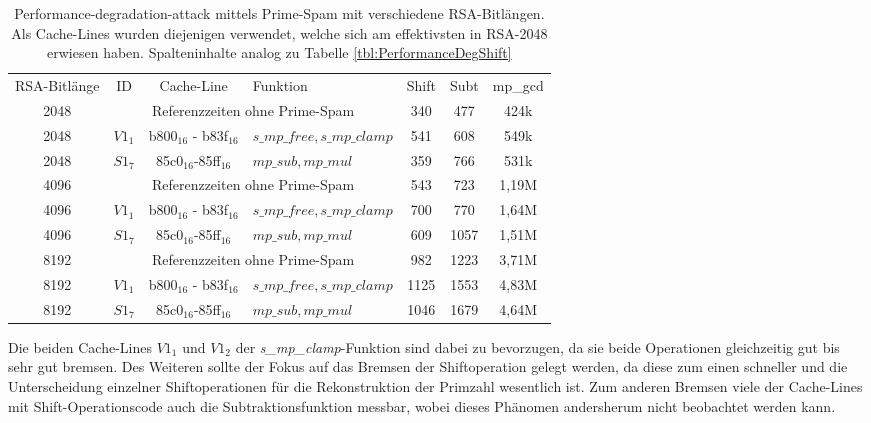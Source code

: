 \begin{table}[h]
\caption{Performance-degradation-attack mittels Prime-Spam mit verschiedene RSA-Bitlängen.
Als Cache-Lines wurden diejenigen verwendet, welche sich am effektivsten in RSA-2048 erwiesen haben.
Spalteninhalte analog zu Tabelle \ref{tbl:PerformanceDegShift}}
\label{tbl:PerformanceDegR$S2_6$ifferentBitlength}
\begin{tabular}{ccclccc}
RSA-Bitlänge & ID & Cache-Line & Funktion & Shift & Subt & mp\_gcd \\[10pt]
2048         &\multicolumn{3}{c}{Referenzzeiten ohne Prime-Spam}                                         & 340   & 477         & 424k    \\
2048         & $V1_1$& b800$_{16}$ - b83f$_{16}$ & $s\_mp\_free, s\_mp\_clamp$                 & 541   & 608         & 549k    \\
2048         & $S1_7$& 85c0$_{16}$-85ff$_{16}$  & $mp\_sub, mp\_mul$            & 359   & 766         & 531k    \\
4096         & \multicolumn{3}{c}{Referenzzeiten ohne Prime-Spam}                                         & 543   & 723         & 1,19M    \\
4096         & $V1_1$& b800$_{16}$ - b83f$_{16}$ & $s\_mp\_free, s\_mp\_clamp$                 & 700   & 770         & 1,64M    \\
4096         & $S1_7$& 85c0$_{16}$-85ff$_{16}$  & $mp\_sub, mp\_mul$            & 609   & 1057         & 1,51M    \\
8192         & \multicolumn{3}{c}{Referenzzeiten ohne Prime-Spam}                                         & 982   & 1223         & 3,71M    \\
8192         & $V1_1$& b800$_{16}$ - b83f$_{16}$ & $s\_mp\_free, s\_mp\_clamp$                 & 1125   & 1553         & 4,83M    \\
8192         & $S1_7$& 85c0$_{16}$-85ff$_{16}$  & $mp\_sub, mp\_mul$            & 1046   & 1679         & 4,64M    \\
\end{tabular}
\end{table}

Die beiden Cache-Lines $V1_1$ und $V1_2$ der \textit{s_mp_clamp}-Funktion sind dabei zu bevorzugen, da sie beide Operationen gleichzeitig gut bis sehr gut bremsen.
Des Weiteren sollte der Fokus auf das Bremsen der Shiftoperation gelegt werden, da diese zum einen schneller und die Unterscheidung einzelner Shiftoperationen für die Rekonstruktion der Primzahl wesentlich ist.
Zum anderen Bremsen viele der Cache-Lines mit Shift-Operationscode auch die Subtraktionsfunktion messbar, wobei dieses Phänomen andersherum nicht beobachtet werden kann. 

